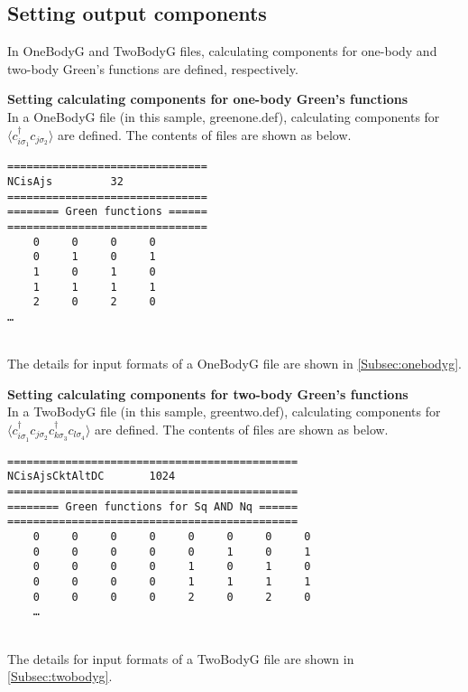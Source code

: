 \subsection{Setting output components}
In OneBodyG and TwoBodyG files, calculating components for one-body and two-body Green's functions are defined, respectively. 
\begin{description}
\item {\bf Setting calculating components for one-body Green's functions}\\
In a OneBodyG file (in this sample, greenone.def), calculating components for $\langle c_{i\sigma_1}^{\dag}c_{j\sigma_2} \rangle$ are defined. The contents of files are shown as below.\\
\begin{minipage}{15cm}
\begin{screen}
\begin{verbatim}
===============================
NCisAjs         32
===============================
======== Green functions ======
===============================
    0     0     0     0
    0     1     0     1
    1     0     1     0
    1     1     1     1
    2     0     2     0
…
\end{verbatim}
\end{screen}
\end{minipage}
~\\
The details for input formats of a OneBodyG file are shown in \ref{Subsec:onebodyg}.
\item {\bf Setting calculating components for two-body Green's functions}\\
In a TwoBodyG file (in this sample, greentwo.def), calculating components for $\langle c_{i\sigma_1}^{\dag}c_{j\sigma_2}c_{k\sigma_3}^{\dag}c_{l\sigma_4} \rangle$ are defined. The contents of files are shown as below.\\
\begin{minipage}{15cm}
\begin{screen}
\begin{verbatim}
=============================================
NCisAjsCktAltDC       1024
=============================================
======== Green functions for Sq AND Nq ======
=============================================
    0     0     0     0     0     0     0     0
    0     0     0     0     0     1     0     1
    0     0     0     0     1     0     1     0
    0     0     0     0     1     1     1     1
    0     0     0     0     2     0     2     0
    …
\end{verbatim}
\end{screen}
\end{minipage}
~\\
The details for input formats of a TwoBodyG file are shown in \ref{Subsec:twobodyg}.
\end{description}

